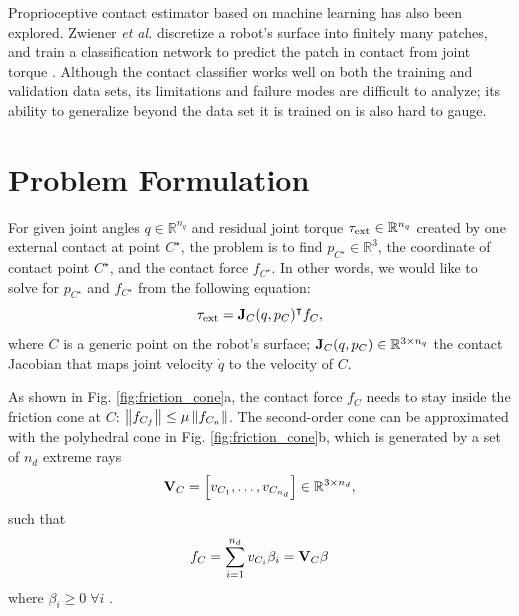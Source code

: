 Proprioceptive contact estimator based on machine learning has also been explored. Zwiener \textit{et al.} discretize a robot's surface into finitely many patches, and train a classification network to predict the patch in contact from joint torque \cite{zwiener2018contact}. Although the contact classifier works well on both the training and validation data sets, its limitations and failure modes are difficult to analyze; its ability to generalize beyond the data set it is trained on is also hard to gauge. 

\section{Problem Formulation \label{sec:problem_statement}}
For given joint angles $q \in \mathbb{R}^{n_q}$ and residual joint torque $\tauE \in \mathbb{R}^{n_q}$ created by one external contact at point $C^\star$, the problem is to find $p_{C^\star} \in \mathbb{R}^3$, the coordinate of contact point $C^\star$, and the contact force $f_{C^\star}$. In other words, we would like to solve for $p_{C^\star}$ and $f_{C^\star}$ from the following equation:
\begin{equation}
\label{eq:torque_jacobian_force}
\tauE = \J_C({q}, {p}_C)^\intercal {f}_C,
\end{equation}
where $C$ is a generic point on the robot's surface; $\J_C({q}, {p}_C) \in \mathbb{R}^{3 \times n_q}$ the contact Jacobian that maps joint velocity $\dot{q}$ to the velocity of $C$. 

As shown in Fig. \ref{fig:friction_cone}a, the contact force ${f}_C$ needs to stay inside the friction cone at $C$: $\norm{{f}_{C_f}} \leq \mu \norm{{f}_{C_n}}$. The second-order cone can be approximated with the polyhedral cone in Fig. \ref{fig:friction_cone}b, which is generated by a set of $n_d$ extreme rays 
\begin{equation}
\mb{V}_C = \left[{v}_{C_1}, \dots, {v}_{C_{n_d}}\right] \in \R[3 \times n_d], 
\end{equation}
such that 
\begin{equation}
{f}_C = \sum_{i=1}^{n_d} {v}_{C_i} \beta_i = \mb{V}_C {\beta}   
\end{equation}
where $\beta_i \geq 0 \; \forall i$ \cite{stewart2000implicit}.    

